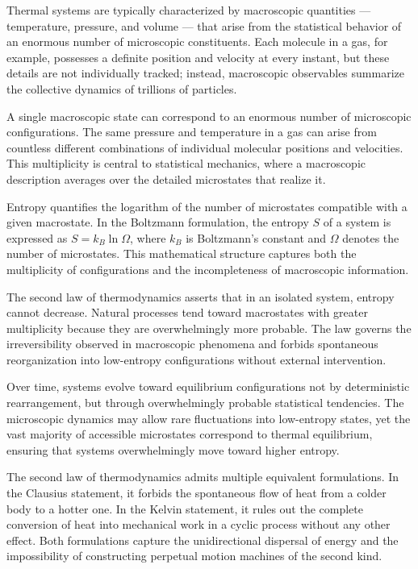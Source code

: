 Thermal systems are typically characterized by macroscopic quantities — temperature, pressure, and volume — that arise from the statistical behavior of an enormous number of microscopic constituents. Each molecule in a gas, for example, possesses a definite position and velocity at every instant, but these details are not individually tracked; instead, macroscopic observables summarize the collective dynamics of trillions of particles.

A single macroscopic state can correspond to an enormous number of microscopic configurations. The same pressure and temperature in a gas can arise from countless different combinations of individual molecular positions and velocities. This multiplicity is central to statistical mechanics, where a macroscopic description averages over the detailed microstates that realize it.

Entropy quantifies the logarithm of the number of microstates compatible with a given macrostate. In the Boltzmann formulation, the entropy $S$ of a system is expressed as $S = k_B \ln \Omega$, where $k_B$ is Boltzmann’s constant and $\Omega$ denotes the number of microstates. This mathematical structure captures both the multiplicity of configurations and the incompleteness of macroscopic information.

The second law of thermodynamics asserts that in an isolated system, entropy cannot decrease. Natural processes tend toward macrostates with greater multiplicity because they are overwhelmingly more probable. The law governs the irreversibility observed in macroscopic phenomena and forbids spontaneous reorganization into low-entropy configurations without external intervention.


Over time, systems evolve toward equilibrium configurations not by deterministic rearrangement, but through overwhelmingly probable statistical tendencies. The microscopic dynamics may allow rare fluctuations into low-entropy states, yet the vast majority of accessible microstates correspond to thermal equilibrium, ensuring that systems overwhelmingly move toward higher entropy.

The second law of thermodynamics admits multiple equivalent formulations. In the Clausius statement, it forbids the spontaneous flow of heat from a colder body to a hotter one. In the Kelvin statement, it rules out the complete conversion of heat into mechanical work in a cyclic process without any other effect. Both formulations capture the unidirectional dispersal of energy and the impossibility of constructing perpetual motion machines of the second kind.

